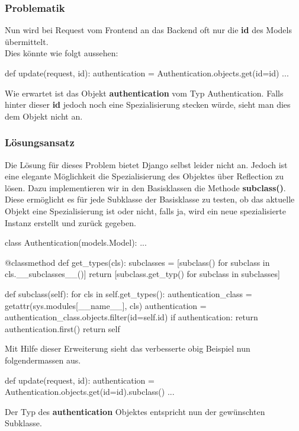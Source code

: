 \subsubsection{Problematik}
Nun wird bei Request vom Frontend an das Backend oft nur die \textbf{id} des Models übermittelt.\\
Dies könnte wie folgt aussehen:
\medskip
\begin{python}
def update(request, id):
    authentication = Authentication.objects.get(id=id)
    ...
\end{python}
\medskip
Wie erwartet ist das Objekt \textbf{authentication} vom Typ Authentication. Falls hinter dieser \textbf{id} jedoch noch eine Spezialisierung stecken würde, sieht man dies dem Objekt nicht an.
\subsubsection{Lösungsansatz}
Die Lösung für dieses Problem bietet Django selbst leider nicht an. Jedoch ist eine elegante Möglichkeit die Spezialisierung des Objektes über Reflection zu lösen. Dazu implementieren wir in den Basisklassen die Methode \textbf{subclass()}.\\
Diese ermöglicht es für jede Subklasse der Basisklasse zu testen, ob das aktuelle Objekt eine Spezialisierung ist oder nicht, falls ja, wird ein neue spezialisierte Instanz erstellt und zurück gegeben.
\medskip
\begin{python}
class Authentication(models.Model):
	...
	
    @classmethod
    def get_types(cls):
        subclasses = [subclass() for subclass in cls.__subclasses__()]
        return [subclass.get_typ() for subclass in subclasses]	
	
    def subclass(self):
        for cls in self.get_types():
            authentication_class = getattr(sys.modules[__name__], cls)
            authentication = authentication_class.objects.filter(id=self.id)
            if authentication:
                return authentication.first()
        return self
\end{python}
\medskip
Mit Hilfe dieser Erweiterung sieht das verbesserte obig Beispiel nun folgendermassen aus.
\medskip
\begin{python}
def update(request, id):
    authentication = Authentication.objects.get(id=id).subclass()
    ...
\end{python}
\medskip
Der Typ des \textbf{authentication} Objektes entspricht nun der gewünschten Subklasse.

\newpage